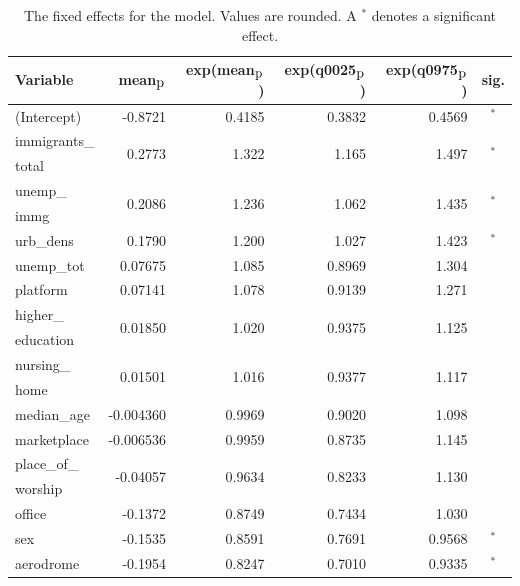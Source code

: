 \begin{table}[H]
\caption{The fixed effects for the model. Values are rounded. A $^*$ denotes a significant effect. \label{fixedAllNorway_nospatial}}
\begin{tabular}{l r r r r c}
\toprule
\textbf{Variable}	& \textbf{mean$_{\hbox{p}}$}	& \textbf{exp(mean$_{\hbox{p}}$)} & \textbf{exp(q0025$_{\hbox{p}}$)} & \textbf{exp(q0975$_{\hbox{p}}$)} & \textbf{sig.}\\
\midrule
(Intercept) & -0.8721 & 0.4185 & 0.3832 & 0.4569 & $^*$ \\
immigrants\_ & \multirow{2}{*}{0.2773}& \multirow{2}{*}{1.322}& \multirow{2}{*}{1.165}& \multirow{2}{*}{1.497}& \multirow{2}{*}{$^*$}\\
total \\
unemp\_ & \multirow{2}{*}{0.2086} & \multirow{2}{*}{1.236} & \multirow{2}{*}{1.062} & \multirow{2}{*}{1.435} & \multirow{2}{*}{$^*$} \\
immg\\
urb\_dens & 0.1790 & 1.200 & 1.027 & 1.423 & $^*$ \\
unemp\_tot & 0.07675 & 1.085 & 0.8969 & 1.304 \\
platform & 0.07141 & 1.078 & 0.9139 & 1.271 \\
higher\_ & \multirow{2}{*}{0.01850}& \multirow{2}{*}{1.020}& \multirow{2}{*}{0.9375}& \multirow{2}{*}{1.125}\\ 
education \\
nursing\_ & \multirow{2}{*}{0.01501} & \multirow{2}{*}{1.016} & \multirow{2}{*}{0.9377} & \multirow{2}{*}{1.117} \\
home\\
median\_age & -0.004360  & 0.9969 & 0.9020 & 1.098 \\
marketplace & -0.006536 & 0.9959 & 0.8735 & 1.145 \\
place\_of\_ & \multirow{2}{*}{-0.04057}& \multirow{2}{*}{0.9634}& \multirow{2}{*}{0.8233}& \multirow{2}{*}{1.130} \\
worship \\
office & -0.1372 & 0.8749 & 0.7434 & 1.030 \\
sex & -0.1535 & 0.8591 & 0.7691 & 0.9568 & $^*$ \\
aerodrome & -0.1954 & 0.8247 & 0.7010 & 0.9335 & $^*$ \\
\bottomrule
\end{tabular}
\end{table}
\clearpage
